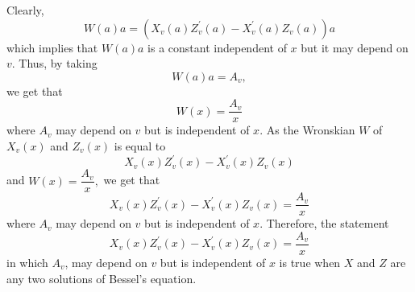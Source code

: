 Clearly, 
$$W(a) a=\left(X_{v}(a) Z_{v}^{\prime}(a)-X_{v}^{\prime}(a) Z_{v}(a)\right) a$$
which implies that $W(a) a$ is a constant
independent of $x$ but it may depend on $v$. Thus, by taking 
$$W(a) a=A_{v},$$ 
we get that 
$$W(x)=\frac{A_{v}}{x}$$ 
where $A_{v}$ may depend on $v$ but is independent of $x$. As the Wronskian $W$ of $X_{v}(x)$ and $Z_{v}(x)$ is equal to 
$$X_{v}(x) Z_{v}^{\prime}(x)-X_{v}^{\prime}(x) Z_{v}(x)$$ 
and $W(x)=\dfrac{A_{v}}{x},$ we get that 
$$X_{v}(x) Z_{v}^{\prime}(x)-X_{v}^{\prime}(x) Z_{v}(x)=\frac{A_{v}}{x}$$ 
where $A_{v}$ may depend on $v$ but
is independent of $x$. Therefore, the statement  
$$X_{v}(x) Z_{v}^{\prime}(x)-X_{v}^{\prime}(x) Z_{v}(x)=\frac{A_{v}}{x}$$ 
in which $A_{v}$, may depend on $v$ but is independent of $x$ is true when $X$ and $Z$ are any two solutions of Bessel's
equation.

\newpage


